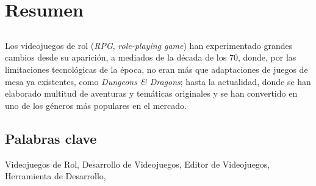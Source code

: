 \chapter*{Resumen}

\section*{\tituloPortadaVal}

Los videojuegos de rol (\textit{RPG}, \textit{role-playing game}) han experimentado grandes cambios desde su aparición, a mediados de la década de los 70, donde, por las limitaciones tecnológicas de la época, no eran más que adaptaciones de juegos de mesa ya existentes, como \textit{Dungeons \& Dragons}; hasta la actualidad, donde se han elaborado multitud de aventuras y temáticas originales y se han convertido en uno de los géneros más populares en el mercado. 
\\



\section*{Palabras clave}
   
\noindent Videojuegos de Rol, Desarrollo de Videojuegos, Editor de Videojuegos, Herramienta de Desarrollo,

   


